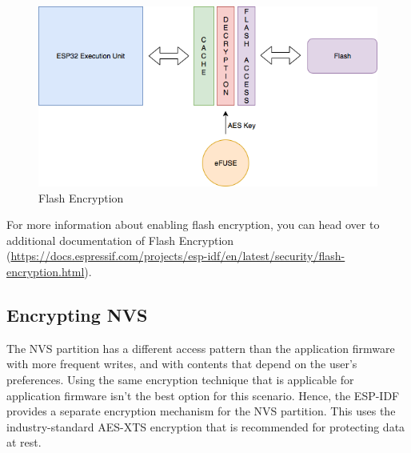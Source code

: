 \documentclass[main.tex]{subfiles}
\begin{document}
\begin{figure}[h!]
    \centering
    \includegraphics[scale=0.5]{../../_static/flash_encryption.png}
    \caption{Flash Encryption}
    \label{fig:flash_encrypt}
\end{figure}

For more information about enabling flash encryption, you can head over to additional documentation of Flash Encryption (\url{https://docs.espressif.com/projects/esp-idf/en/latest/security/flash-encryption.html}).

\subsection{Encrypting NVS}

The NVS partition has a different access pattern than the application firmware with more frequent writes, and with contents that depend on the user's preferences. Using the same encryption technique that is applicable for application firmware isn't the best option for this scenario. Hence, the ESP-IDF provides a separate encryption mechanism for the NVS partition. This uses the industry-standard AES-XTS encryption that is recommended for protecting data at rest.
\end{document}
